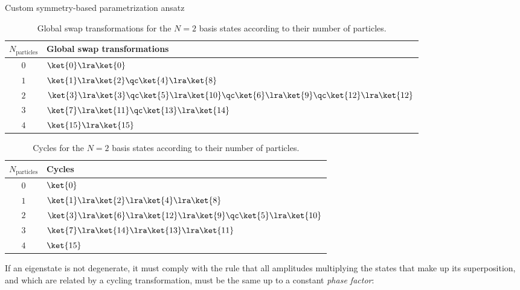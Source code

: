 \begin{frame}[allowframebreaks]{Custom symmetry-based parametrization ansatz}
	\begin{table}[!bp]
	  \centering
	  \caption{Global swap transformations for the $N=2$ basis states according to their number of particles.}
	  \label{tab:symmetry-ansatz-basis2-swaps}
	  \begin{tabular}{ c l }
	    \hline
	    $N_\text{particles}$ & Global swap transformations \\
	    \hline
	    \hline
	    $0$ & $\ket{0} \lra \ket{0}$ \\
	    \hline
	    $1$ & $\ket{1} \lra \ket{2} \qc \ket{4} \lra \ket{8}$ \\
	    \hline
	    $2$ & $\ket{3} \lra \ket{3} \qc \ket{5} \lra \ket{10} \qc
	      \ket{6} \lra \ket{9} \qc \ket{12} \lra \ket{12}$ \\
	    \hline
	    $3$ & $\ket{7} \lra \ket{11} \qc \ket{13} \lra \ket{14}$ \\
	    \hline
	    $4$ & $\ket{15} \lra \ket{15}$ \\
	    \hline
	  \end{tabular}
	\end{table}

	\begin{table}[!bp]
	  \centering
	  \caption{Cycles for the $N=2$ basis states according to their number of particles.}
	  \label{tab:symmetry-ansatz-basis2-cycles}
	  \begin{tabular}{ c l }
	    \hline
	    $N_\text{particles}$ & Cycles \\
	    \hline
	    \hline
	    $0$ & $\ket{0}$ \\
	    \hline
	    $1$ & $\ket{1} \lra \ket{2} \lra \ket{4} \lra \ket{8}$ \\
	    \hline
	    $2$ & $\ket{3} \lra \ket{6} \lra \ket{12} \lra \ket{9} \qc
	      \ket{5} \lra \ket{10}$ \\
	    \hline
	    $3$ & $\ket{7} \lra \ket{14} \lra \ket{13} \lra \ket{11}$ \\
	    \hline
	    $4$ & $\ket{15}$ \\
	    \hline
	  \end{tabular}
	\end{table}

\break

	If an eigenstate is not degenerate, it must comply with the rule that all amplitudes multiplying the states that make up its superposition, and which are related by a cycling transformation, must be the same up to a constant \emph{phase factor}:


\end{frame}
